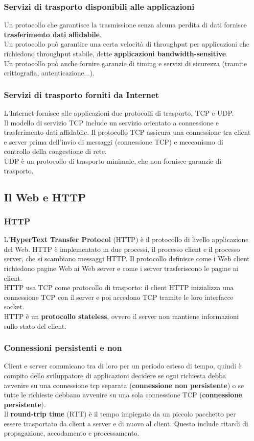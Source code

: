 \documentclass[11pt]{article}
\begin{document}
\subsubsection{Servizi di trasporto disponibili alle applicazioni}
Un protocollo che garantisce la trasmissione senza alcuna perdita di dati fornisce \textbf{trasferimento dati affidabile}.\\
Un protocollo può garantire una certa velocità di throughput per applicazioni che richiedono throughput stabile, dette 
\textbf{applicazioni bandwidth-sensitive}.\\
Un protocollo può anche fornire garanzie di timing e servizi di sicurezza (tramite crittografia, autenticazione...).
\subsubsection{Servizi di trasporto forniti da Internet}
L'Internet fornisce alle applicazioni due protocolli di trasporto, TCP e UDP.\\
Il modello di servizio TCP include un servizio orientato a connessione e trasferimento dati affidabile. Il protocollo
TCP assicura una connessione tra client e server prima dell'invio di messaggi (connessione TCP) e meccanismo di controllo 
della congestione di rete.\\
UDP è un protocollo di trasporto minimale, che non fornisce garanzie di trasporto.
\subsection{Il Web e HTTP}
\subsubsection{HTTP}
L'\textbf{HyperText Transfer Protocol} (HTTP) è il protocollo di livello applicazione del Web. HTTP è implementato in due 
processi, il processo client e il processo server, che si scambiano messaggi HTTP. Il protocollo definisce come i Web
client richiedono pagine Web ai Web server e come i server trasferiscono le pagine ai client.\\
HTTP usa TCP come protocollo di trasporto: il client HTTP inizializza una connessione TCP con il server e poi accedono 
TCP tramite le loro interfacce socket.\\
HTTP è un \textbf{protocollo stateless}, ovvero il server non mantiene informazioni sullo stato del client.
\subsubsection{Connessioni persistenti e non}
Client e server comunicano tra di loro per un periodo esteso di tempo, quindi è compito dello sviluppatore di applicazioni
decidere se ogni richiesta debba avvenire su una connessione tcp separata (\textbf{connessione non persistente}) o se 
tutte le richieste debbano avvenire su una sola connessione TCP (\textbf{connessione persistente}).\\
Il \textbf{round-trip time} (RTT) è il tempo impiegato da un piccolo pacchetto per essere trasportato da client a server
e di nuovo al client. Questo include ritardi di propagazione, accodamento e processamento.
\end{document}
